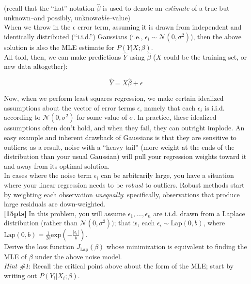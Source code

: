 \documentclass[paper=a4, fontsize=11pt]{scrartcl} %
\numberwithin{figure}{section} %
\numberwithin{table}{section} %
\begin{document}
(recall that the ``hat'' notation $\hat{\beta}$ is used to denote an \emph{estimate} of a true but unknown--and possibly, unknow\emph{able}--value) \\

When we throw in the $\epsilon$ error term, assuming it is drawn from independent and identically distributed (``i.i.d.'') Gaussians (i.e., $\epsilon_i \sim \mathcal{N}(0, \sigma^2)$), then the above solution is also the MLE estimate for $P(Y | X; \beta)$. \\

All told, then, we can make predictions $\hat{Y}$ using $\hat{\beta}$ ($X$ could be the training set, or new data altogether):

$$
\hat{Y} = X\hat{\beta} + \epsilon
$$

Now, when we perform least squares regression, we make certain idealized assumptions about the vector of error terms $\epsilon$, namely that each $\epsilon_i$ is i.i.d. according to $\mathcal{N}(0, \sigma^2)$ for some value of $\sigma$. In practice, these idealized assumptions often don't hold, and when they fail, they can outright implode. An easy example and inherent drawback of Gaussians is that they are sensitive to outliers; as a result, noise with a ``heavy tail'' (more weight at the ends of the distribution than your usual Gaussian) will pull your regression weights toward it and away from its optimal solution. \\

In cases where the noise term $\epsilon_i$ can be arbitrarily large, you have a situation where your linear regression needs to be \emph{robust} to outliers. Robust methods start by weighting each observation \emph{unequally}: specifically, observations that produce large residuals are down-weighted. \\

\textbf{[15pts]} In this problem, you will assume $\epsilon_1, ..., \epsilon_n$ are i.i.d. drawn from a Laplace distribution (rather than $\mathcal{N}(0, \sigma^2))$; that is, each $\epsilon_i \sim \textrm{Lap}(0, b)$, where $\textrm{Lap}(0, b) = \frac{1}{2b} \textrm{exp}(-\frac{|\epsilon_i|}{b} )$. \\

Derive the loss function $J_{\textrm{Lap}}(\beta)$ whose minimization is equivalent to finding the MLE of $\beta$ under the above noise model. \\

\emph{Hint \#1}: Recall the critical point above about the form of the MLE; start by writing out $P(Y_i | X_i; \beta)$. \\
\end{document}
